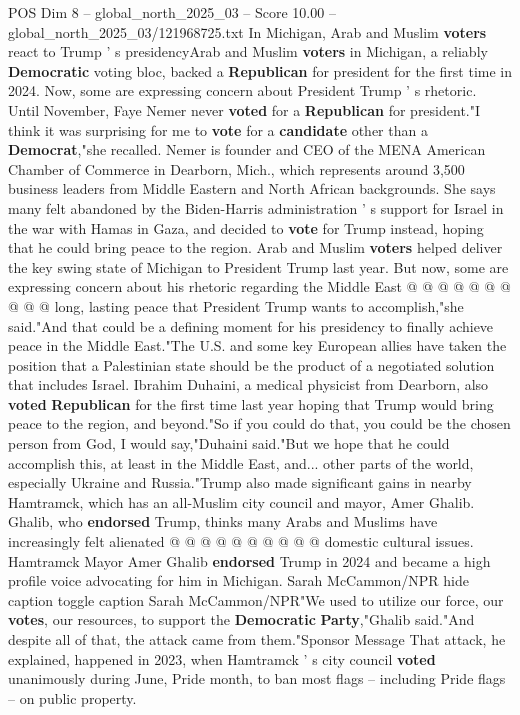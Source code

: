 \begin{textsample}{POS Dim 8 – global\_north\_2025\_03 – Score 10.00 – global\_north\_2025\_03/121968725.txt}  \label{ex:f8_pos_329}
In Michigan, Arab and Muslim \textbf{voters} react to Trump ' s presidencyArab and Muslim \textbf{voters} in Michigan, a reliably \textbf{Democratic} voting bloc, backed a \textbf{Republican} for president for the first time in 2024.
Now, some are expressing concern about President Trump ' s rhetoric.
Until November, Faye Nemer never \textbf{voted} for a \textbf{Republican} for president."I think it was surprising for me to \textbf{vote} for a \textbf{candidate} other than a \textbf{Democrat},"she recalled.
Nemer is founder and CEO of the MENA American Chamber of Commerce in Dearborn, Mich., which represents around 3,500 business leaders from Middle Eastern and North African backgrounds.
She says many felt abandoned by the Biden-Harris administration ' s support for Israel in the war with Hamas in Gaza, and decided to \textbf{vote} for Trump instead, hoping that he could bring peace to the region.
Arab and Muslim \textbf{voters} helped deliver the key swing state of Michigan to President Trump last year.
But now, some are expressing concern about his rhetoric regarding the Middle East @ @ @ @ @ @ @ @ @ @ long, lasting peace that President Trump wants to accomplish,"she said."And that could be a defining moment for his presidency to finally achieve peace in the Middle East."The U.S. and some key European allies have taken the position that a Palestinian state should be the product of a negotiated solution that includes Israel.
Ibrahim Duhaini, a medical physicist from Dearborn, also \textbf{voted} \textbf{Republican} for the first time last year hoping that Trump would bring peace to the region, and beyond."So if you could do that, you could be the chosen person from God, I would say,"Duhaini said."But we hope that he could accomplish this, at least in the Middle East, and... other parts of the world, especially Ukraine and Russia."Trump also made significant gains in nearby Hamtramck, which has an all-Muslim city council and mayor, Amer Ghalib.
Ghalib, who \textbf{endorsed} Trump, thinks many Arabs and Muslims have increasingly felt alienated @ @ @ @ @ @ @ @ @ @ domestic cultural issues.
Hamtramck Mayor Amer Ghalib \textbf{endorsed} Trump in 2024 and became a high profile voice advocating for him in Michigan.
Sarah McCammon/NPR hide caption toggle caption Sarah McCammon/NPR"We used to utilize our force, our \textbf{votes}, our resources, to support the \textbf{Democratic} \textbf{Party},"Ghalib said."And despite all of that, the attack came from them."Sponsor Message That attack, he explained, happened in 2023, when Hamtramck ' s city council \textbf{voted} unanimously during June, Pride month, to ban most flags -- including Pride flags -- on public property.

\end{textsample}
